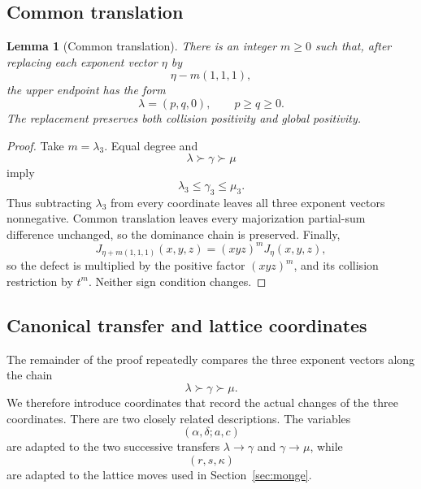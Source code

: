 \documentclass[11pt]{article}
\newtheorem{lemma}[theorem]{Lemma}
\theoremstyle{definition}
\begin{document}
\subsection{Common translation}

\begin{lemma}[Common translation]
\label{lem:common-translation}
There is an integer \(m\ge0\) such that, after replacing each exponent vector \(\eta\) by
\begin{equation*}
\eta-m(1,1,1),
\end{equation*}
the upper endpoint has the form
\begin{equation*}
\lambda=(p,q,0),
\qquad
p\ge q\ge0.
\end{equation*}
The replacement preserves both collision positivity and global positivity.
\end{lemma}

\begin{proof}
Take \(m=\lambda_3\).  Equal degree and
\begin{equation*}
\lambda\succ\gamma\succ\mu
\end{equation*}
imply
\begin{equation*}
\lambda_3\le\gamma_3\le\mu_3.
\end{equation*}
Thus subtracting \(\lambda_3\) from every coordinate leaves all three exponent vectors nonnegative.  Common translation leaves every majorization partial-sum difference unchanged, so the dominance chain is preserved.  Finally,
\begin{equation*}
J_{\eta+m(1,1,1)}(x,y,z)=(xyz)^mJ_\eta(x,y,z),
\end{equation*}
so the defect is multiplied by the positive factor \((xyz)^m\), and its collision restriction by \(t^m\).  Neither sign condition changes.
\end{proof}

\subsection{Canonical transfer and lattice coordinates}
\label{sec:canonical-coordinates}

The remainder of the proof repeatedly compares the three exponent vectors along the chain
\begin{equation*}
\lambda\succ\gamma\succ\mu.
\end{equation*}
We therefore introduce coordinates that record the actual changes of the three coordinates.  There are two closely related descriptions.  The variables
\begin{equation*}
(\alpha,\delta;a,c)
\end{equation*}
are adapted to the two successive transfers
\(\lambda\to\gamma\) and \(\gamma\to\mu\), while
\begin{equation*}
(r,s,\kappa)
\end{equation*}
are adapted to the lattice moves used in Section~\ref{sec:monge}.
\end{document}
